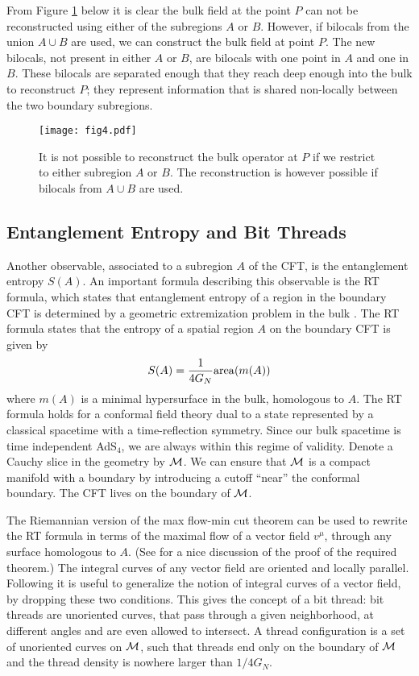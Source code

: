 \documentclass[a4paper,12pt]{article}
\def\bea{\begin{eqnarray}}
\def\eea{\end{eqnarray}}
\begin{document}
From Figure \ref{fig:QECSolid} below it is clear the bulk field at the point $P$ can not be reconstructed using either of the
subregions $A$ or $B$. 
However, if bilocals from the union $A\cup B$ are used, we can construct the bulk field at point $P$.
The new bilocals, not present in either $A$ or $B$, are bilocals with one point in $A$ and one in $B$.
These bilocals are separated enough that they reach deep enough into the bulk to reconstruct $P$; they represent
information that is shared non-locally between the two boundary subregions.
%
\begin{figure}[h]%
\begin{center}
\texttt{[image: fig4.pdf]}%
\caption{It is not possible to reconstruct the bulk operator at $P$ if we restrict to either subregion $A$ or $B$.
The reconstruction is however possible if bilocals from $A\cup B$ are used.}
\label{fig:QECSolid}
\end{center}
\end{figure}

\subsection{Entanglement Entropy and Bit Threads}

Another observable, associated to a subregion $A$ of the CFT, is the entanglement entropy $S(A)$.
An important formula describing this observable is the RT formula, which states that entanglement 
entropy of a region in the boundary CFT is determined by a geometric extremization problem in the bulk 
\cite{Ryu:2006bv,Ryu:2006ef}. 
The RT formula states that the entropy of a spatial region $A$ on the boundary CFT is given by
%
\bea
S(A)={1\over 4G_N}{\rm area}(m(A))
\eea
%
where $m(A)$ is a minimal hypersurface in the bulk, homologous to $A$. 
The RT formula holds for a conformal field theory dual to a state represented by a classical spacetime with a 
time-reflection symmetry. 
Since our bulk spacetime is time independent AdS$_4$, we are always within this regime of validity.
Denote a Cauchy slice in the geometry by ${\cal M}$.
We can ensure that ${\cal M}$ is a compact manifold with a boundary by introducing a cutoff ``near'' the conformal boundary.
The CFT lives on the boundary of ${\cal M}$.

The Riemannian version of the max flow-min cut theorem can be used to rewrite the RT formula in terms of the maximal
flow of a vector field $v^\mu$, through any surface homologous to $A$\cite{Freedman:2016zud}.
(See \cite{Headrick:2017ucz} for a nice discussion of the proof of the required theorem.)
The integral curves of any vector field are oriented and locally parallel. 
Following \cite{Cui:2018dyq} it is useful to generalize the notion of integral curves of a vector field, 
by dropping these two conditions.
This gives the concept of a bit thread: bit threads are unoriented curves, that pass through a given neighborhood, 
at different angles and are even allowed to intersect. 
A thread configuration is a set of unoriented curves on ${\cal M}$, such that threads end only on the boundary of 
${\cal M}$ and the thread density is nowhere larger than $1/4G_N$.
\end{document}

